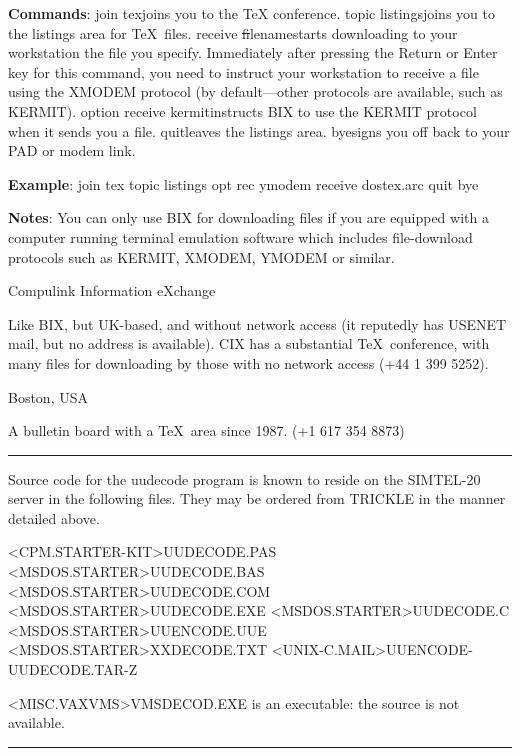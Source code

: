 {\bf Commands}:\nl
{\tx join tex}\quad joins you to the {\tx TeX} conference.\nl
{\tx topic listings}\quad joins you to the {\tx listings} area for \TeX\
     files. \nl
{\tx receive} {\st filename}\quad starts downloading to your workstation
     the file you specify. Immediately after pressing the Return or
     Enter key for this command, you need to instruct your workstation
     to receive a file using the XMODEM protocol (by default---other
     protocols are available, such as KERMIT).\nl
{\tx option receive kermit}\quad instructs BIX to use the KERMIT
     protocol when it sends you a file. \nl
{\tx quit}\quad leaves the listings area.\nl
{\tx bye}\quad signs you off back to your PAD or modem link.

{\bf Example}: \nl
{\tx join tex }\nl
{\tx topic listings}\nl
{\tx opt rec ymodem}\nl
{\tx receive dostex.arc}\nl
{\tx quit}\nl
{\tx bye }

{\bf Notes}:  You can only use BIX for downloading files if you are
     equipped with a computer running terminal emulation software which
     includes file-download protocols such as KERMIT, XMODEM, YMODEM or
     similar.

 {Compulink Information eXchange}

     Like BIX, but UK-based, and without network access (it reputedly
     has USENET mail, but no address is available). CIX has a
     substantial \TeX\ conference, with many files for downloading by
     those with no network access (+44 1 399 5252).

 {Boston, USA}

     A bulletin board with a \TeX\ area since 1987. (+1 617 354 8873)

\bigskip
\hrule%
\bigskip

     Source code for the {\tx uudecode} program is known to reside on
     the SIMTEL-20 server in the following files. They may be ordered
     from TRICKLE in the manner detailed above.

{\tx <CPM.STARTER-KIT>UUDECODE.PAS}\nl
{\tx <MSDOS.STARTER>UUDECODE.BAS}\nl
{\tx <MSDOS.STARTER>UUDECODE.COM}\nl
{\tx <MSDOS.STARTER>UUDECODE.EXE}\nl
{\tx <MSDOS.STARTER>UUDECODE.C}\nl
{\tx <MSDOS.STARTER>UUENCODE.UUE}\nl
{\tx <MSDOS.STARTER>XXDECODE.TXT}\nl
{\tx <UNIX-C.MAIL>UUENCODE-UUDECODE.TAR-Z}

{\tx <MISC.VAXVMS>VMSDECOD.EXE} is an executable: the source is not available.

\bigskip
\hrule%
\bigskip

